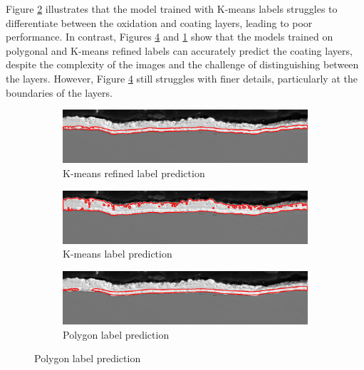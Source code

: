 Figure \ref{fig:kmeans} illustrates that the model trained with K-means labels struggles to differentiate between the oxidation and coating layers, leading to poor performance. In contrast, Figures \ref{fig:polygon} and \ref{fig:kmeans-refined} show that the models trained on polygonal and K-means refined labels can accurately predict the coating layers, despite the complexity of the images and the challenge of distinguishing between the layers. However, Figure \ref{fig:polygon} still struggles with finer details, particularly at the boundaries of the layers.


\begin{figure}[H]
    \centering
    \begin{subfigure}[b]{0.75\linewidth}
        \centering
        \includegraphics[width=\linewidth]{PICTURES/eval/188_kmeans_refined.png}
        \caption{K-means refined label prediction}
        \label{fig:kmeans-refined}
    \end{subfigure}
    
    \vspace{0.5cm}
    
    \begin{subfigure}[b]{0.75\linewidth}
        \centering
        \includegraphics[width=\linewidth]{PICTURES/eval/188_kmeans.png}
        \caption{K-means label prediction}
        \label{fig:kmeans}
    \end{subfigure}

    \vspace{0.5cm}
    
    \begin{subfigure}[b]{0.75\linewidth}
        \centering
        \includegraphics[width=\linewidth]{PICTURES/eval/188_polygon.png}
        \caption{Polygon label prediction}
        \label{fig:polygon}
    \end{subfigure}
    

\end{figure}
